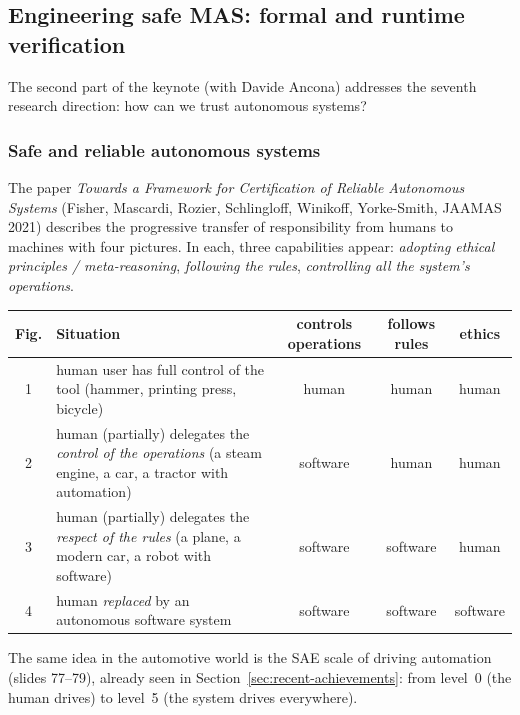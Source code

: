 \subsection{Engineering safe MAS: formal and runtime verification}
\label{sec:safe-mas}

The second part of the keynote (with Davide Ancona) addresses the seventh research
direction: how can we trust autonomous systems?

\subsubsection{Safe and reliable autonomous systems}

The paper \emph{Towards a Framework for Certification of Reliable Autonomous Systems}
(Fisher, Mascardi, Rozier, Schlingloff, Winikoff, Yorke-Smith, JAAMAS 2021) describes the
progressive transfer of responsibility from humans to machines with four pictures. In each,
three capabilities appear: \emph{adopting ethical principles / meta-reasoning},
\emph{following the rules}, \emph{controlling all the system's operations}.

\begin{center}
\small
\renewcommand{\arraystretch}{1.2}
\begin{tabularx}{\linewidth}{@{}c >{\raggedright\arraybackslash}X c c c@{}}
\toprule
\textbf{Fig.} & \textbf{Situation} & \textbf{controls operations} & \textbf{follows rules} & \textbf{ethics} \\
\midrule
1 & human user has full control of the tool (hammer, printing press, bicycle) & human & human & human \\
2 & human (partially) delegates the \emph{control of the operations} (a steam engine, a car, a tractor with automation) & software & human & human \\
3 & human (partially) delegates the \emph{respect of the rules} (a plane, a modern car, a robot with software) & software & software & human \\
4 & human \emph{replaced} by an autonomous software system & software & software & software \\
\bottomrule
\end{tabularx}
\end{center}

The same idea in the automotive world is the SAE scale of driving automation (slides 77--79),
already seen in Section~\ref{sec:recent-achievements}: from level~0 (the human drives) to
level~5 (the system drives everywhere).

